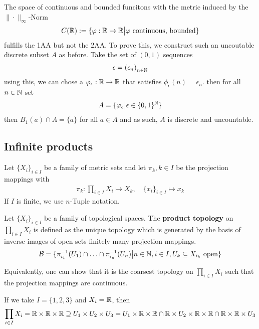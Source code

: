 \begin{ex}[]
  The space of continuous and bounded funcitons with the metric induced by the $\|\cdot\|_{\infty}$-Norm
  \begin{align*}
    C(\mathbb{R}) := \{\varphi:  \mathbb{R} \to \mathbb{R} \big\vert \varphi \text{ continuous, bounded}\}
  \end{align*}
  fulfills the 1AA but not the 2AA.
  To prove this, we construct such an uncoutable discrete subset $A$ as before. Take the set of $(0,1)$ sequences
  \begin{align*}
    \epsilon = \left(\epsilon_{n}\right)_{n \in \mathbb{N}}
  \end{align*}
  using this, we can chose a $\varphi_{\epsilon}: \mathbb{R} \to \mathbb{R}$ that satisfies $\phi_{\epsilon}(n) = \epsilon_n$.
  then for all $n \in \mathbb{N}$ set
  \begin{align*}
    A = \{\varphi_{\epsilon} \big\vert \epsilon \in \{0,1\}^{\mathbb{N}}\}
  \end{align*}
  then $B_1(a) \cap A = \{a\}$ for all $a \in A$ and as such, $A$ is discrete and uncountable.
\end{ex}



\subsection{Infinite products}
Let $\{X_i\}_{i \in I}$ be a family of metric sets and let $\pi_k, k \in I$ be the projection mappings with
\begin{align*}
  \pi_k: \prod_{i \in I}X_i \mapsto  X_k, \quad \{x_i\}_{i \in I} \mapsto  x_k
\end{align*}
If $I$ is finite, we use $n$-Tuple notation.


\begin{dfn}[]
Let $\{X_i\}_{i \in I}$ be a family of topological spaces.
The \textbf{product topology} on $\prod_{i \in I}X_i$ is defined as the unique topology which is generated by the basis of inverse images of open sets finitely many projection mappings.
  \begin{align*}
    \mathcal{B} = \{\pi_{i_1}^{-1}(U_1) \cap \ldots \cap \pi_{i_n}^{-1}(U_n) \big\vert n \in \mathbb{N}, i \in I, U_k \subseteq X_{i_k} \text{ open}\}
  \end{align*}
\end{dfn}
Equivalently, one can show that it is the coarsest topology on $\prod_{i \in I} X_i$ such that the projection mappings are continuous.

\begin{ex}[]
If we take $I = \{1,2,3\}$ and $X_i = \mathbb{R}$, then
\begin{align*}
  \prod_{i \in I}X_i = \mathbb{R} \times \mathbb{R} \times \mathbb{R} \supseteq U_1 \times U_2 \times U_3 = U_1 \times \mathbb{R} \times \mathbb{R} \cap \mathbb{R} \times U_2 \times \mathbb{R} \times \mathbb{R} \cap \mathbb{R} \times \mathbb{R} \times U_3
\end{align*} 
\end{ex}

